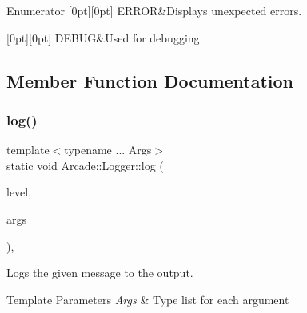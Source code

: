 \begin{DoxyEnumFields}{Enumerator}
[0pt][0pt]{}\mbox{\label{classArcade_1_1Logger_a9b6365ec3dfe94ac7d296ad60d4b3b20a7dc500efbea520e3cf58551c7c76d694}} 
E\+R\+R\+OR&Displays unexpected errors. \\
\hline

[0pt][0pt]{}\mbox{\label{classArcade_1_1Logger_a9b6365ec3dfe94ac7d296ad60d4b3b20a2df55fe7b387ec1cdb7a780e6a95bbbc}} 
D\+E\+B\+UG&Used for debugging. \\
\hline

\end{DoxyEnumFields}


\subsection{Member Function Documentation}
\mbox{\label{classArcade_1_1Logger_aeb95c0e88e1d1b0df97006a04fd5a011}} 
\subsubsection{\texorpdfstring{log()}{log()}}
{\footnotesize\ttfamily template$<$typename ... Args$>$ \\
static void Arcade\+::\+Logger\+::log (\begin{DoxyParamCaption}\item[{\mbox{\hyperlink{classArcade_1_1Logger_a9b6365ec3dfe94ac7d296ad60d4b3b20}{Log\+Level}}}]{level,  }\item[{Args \&\&...}]{args }\end{DoxyParamCaption})\hspace{0.3cm}{\ttfamily [inline]}, {\ttfamily [static]}}



Logs the given message to the output. 


\begin{DoxyTemplParams}{Template Parameters}
{\em Args} & Type list for each argument \\
\hline
\end{DoxyTemplParams}

